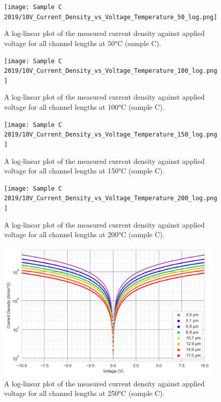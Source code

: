 \begin{figure}[h]
    \centering
    \texttt{[image: Sample C 2019/10V\_Current\_Density\_vs\_Voltage\_Temperature\_50\_log.png]}
    \caption{A log-linear plot of the measured current density against applied voltage for all channel lengths at 50\si{\degreeCelsius} (sample C).}
    \label{appfig:current_density_50}
\end{figure}
\begin{figure}[h]
    \centering
    \texttt{[image: Sample C 2019/10V\_Current\_Density\_vs\_Voltage\_Temperature\_100\_log.png]}
    \caption{A log-linear plot of the measured current density against applied voltage for all channel lengths at 100\si{\degreeCelsius} (sample C).}
    \label{appfig:current_density_100}
\end{figure}
\begin{figure}[h]
    \centering
    \texttt{[image: Sample C 2019/10V\_Current\_Density\_vs\_Voltage\_Temperature\_150\_log.png]}
    \caption{A log-linear plot of the measured current density against applied voltage for all channel lengths at 150\si{\degreeCelsius} (sample C).}
    \label{appfig:current_density_150}
\end{figure}
\begin{figure}[h]
    \centering
    \texttt{[image: Sample C 2019/10V\_Current\_Density\_vs\_Voltage\_Temperature\_200\_log.png]}
    \caption{A log-linear plot of the measured current density against applied voltage for all channel lengths at 200\si{\degreeCelsius} (sample C).}
    \label{appfig:current_density_200}
\end{figure}
\begin{figure}[h]
    \centering
    \includegraphics[width=0.97\textwidth]{Chapter3/Figs/Raster/Sample C 2019/10V_Current_Density_vs_Voltage_Temperature_250_log.png}
    \caption{A log-linear plot of the measured current density against applied voltage for all channel lengths at 250\si{\degreeCelsius} (sample C).}
    \label{appfig:current_density_250}
\end{figure}
